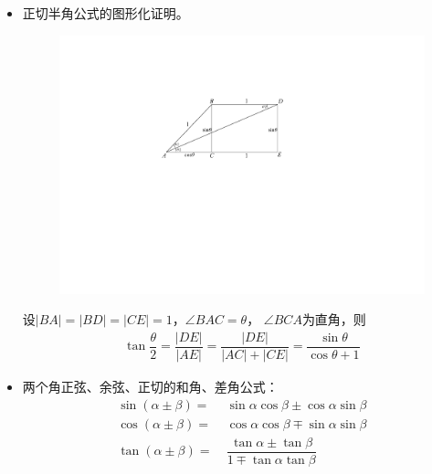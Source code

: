 \begin{itemize}[leftmargin=\inteval{\myitemleftmargin}pt,itemsep=
   \inteval{\myitemitempsep}pt,topsep=\inteval{\myitemtopsep}pt]
\item  正切半角公式的图形化证明。
\begin{figure}[H]
    \centering
    \includegraphics[width=0.5\linewidth]{PDF_Picture/正切半角公式的图形化证明}
\end{figure}
设$|BA|=|BD|=|CE|=1$，$\angle BAC=\theta$，
$\angle BCA $为直角，则
\begin{gather*}
    \tan\dfrac{\theta}{2}=\dfrac{|DE|}{|AE|}=
    \dfrac{|DE|}{|AC|+|CE|}=\dfrac{\sin\theta}{\cos\theta+1}
\end{gather*}

\item 两个角正弦、余弦、正切的和角、差角公式：
\begin{align*} 
\sin(\alpha\pm\beta)=&\ \sin\alpha\cos\beta \pm
 \cos\alpha\sin\beta \\
\cos(\alpha\pm\beta)=&\ \cos\alpha\cos\beta \mp
 \sin\alpha\sin\beta \\
\tan(\alpha\pm\beta)=&\ \dfrac{\tan \alpha\pm\tan \beta}
 {1\mp \tan \alpha \tan \beta} 
\end{align*}


\end{itemize}

